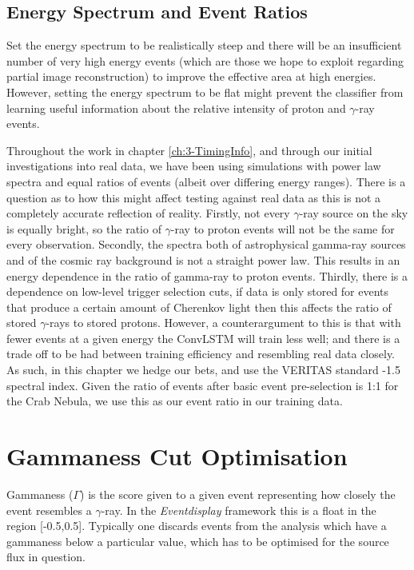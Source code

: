 \subsection{Energy Spectrum and Event Ratios}
Set the energy spectrum to be realistically steep and there will be an insufficient number of very high energy events (which are those we hope to exploit regarding partial image reconstruction) to improve the effective area at high energies. However, setting the energy spectrum to be flat might prevent the classifier from learning useful information about the relative intensity of proton and $\gamma$-ray events.

Throughout the work in chapter \ref{ch:3-TimingInfo}, and through our initial investigations into real data, we have been using simulations with power law spectra and equal ratios of events (albeit over differing energy ranges). There is a question as to how this might affect testing against real data as this is not a completely accurate reflection of reality. Firstly, not every $\gamma$-ray source on the sky is equally bright, so the ratio of $\gamma$-ray to proton events will not be the same for every observation. Secondly, the spectra both of astrophysical gamma-ray sources and of the cosmic ray background is not a straight power law. This results in an energy dependence in the ratio of gamma-ray to proton events. Thirdly, there is a dependence on low-level trigger selection cuts, if data is only stored for events that produce a certain amount of Cherenkov light then this affects the ratio of stored $\gamma$-rays to stored protons. However, a counterargument to this is that with fewer events at a given energy the ConvLSTM will train less well; and there is a trade off to be had between training efficiency and resembling real data closely. As such, in this chapter we hedge our bets, and use the VERITAS standard -1.5 spectral index. Given the ratio of events after basic event pre-selection is 1:1 for the Crab Nebula, we use this as our event ratio in our training data.

\section{Gammaness Cut Optimisation}
Gammaness ($\Gamma$) is the score given to a given event representing how closely the event resembles a $\gamma$-ray. In the \textit{Eventdisplay} framework this is a float in the region [-0.5,0.5]. Typically one discards events from the analysis which have a gammaness below a particular value, which has to be optimised for the source flux in question. 

